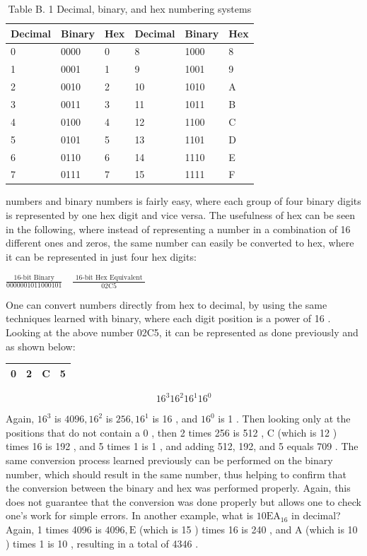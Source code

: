 \documentclass[10pt]{article}
\begin{document}
\begin{table}[h]
\begin{center}
\captionsetup{labelformat=empty}
\caption{Table B. 1 Decimal, binary, and hex numbering systems}
\begin{tabular}{|l|l|l|l|l|l|}
\hline
Decimal & Binary & Hex & Decimal & Binary & Hex \\
\hline
0 & 0000 & 0 & 8 & 1000 & 8 \\
\hline
1 & 0001 & 1 & 9 & 1001 & 9 \\
\hline
2 & 0010 & 2 & 10 & 1010 & A \\
\hline
3 & 0011 & 3 & 11 & 1011 & B \\
\hline
4 & 0100 & 4 & 12 & 1100 & C \\
\hline
5 & 0101 & 5 & 13 & 1101 & D \\
\hline
6 & 0110 & 6 & 14 & 1110 & E \\
\hline
7 & 0111 & 7 & 15 & 1111 & F \\
\hline
\end{tabular}
\end{center}
\end{table}

numbers and binary numbers is fairly easy, where each group of four binary digits is represented by one hex digit and vice versa. The usefulness of hex can be seen in the following, where instead of representing a number in a combination of 16 different ones and zeros, the same number can easily be converted to hex, where it can be represented in just four hex digits:

$\frac{\text { 16-bit Binary }}{0000001011000101} \quad \frac{\text { 16-bit Hex Equivalent }}{02 \mathrm{C} 5}$

One can convert numbers directly from hex to decimal, by using the same techniques learned with binary, where each digit position is a power of 16 . Looking at the above number 02C5, it can be represented as done previously and as shown below:

\begin{center}
\begin{tabular}{|l|l|l|l|}
\hline
0 & 2 & C & 5 \\
\hline
\end{tabular}
\end{center}

$$
16^{3} 16^{2} 16^{1} 16^{0}
$$

Again, $16^{3}$ is $4096,16^{2}$ is $256,16^{1}$ is 16 , and $16^{0}$ is 1 . Then looking only at the positions that do not contain a 0 , then 2 times 256 is 512 , C (which is 12 ) times 16 is 192 , and 5 times 1 is 1 , and adding 512, 192, and 5 equals 709 . The same conversion process learned previously can be performed on the binary number, which should result in the same number, thus helping to confirm that the conversion between the binary and hex was performed properly. Again, this does not guarantee that the conversion was done properly but allows one to check one's work for simple errors. In another example, what is $10 \mathrm{EA}_{16}$ in decimal? Again, 1 times 4096 is $4096, \mathrm{E}$ (which is 15 ) times 16 is 240 , and A (which is 10 ) times 1 is 10 , resulting in a total of 4346 .
\end{document}
